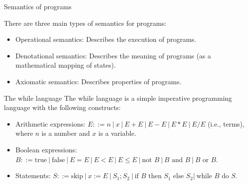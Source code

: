 \documentclass{beamer}
\begin{document}
\begin{frame}{Semantics of programs}

  There are three main types of semantics for programs:
  \begin{itemize}
  \item Operational semantics: Describes the execution of programs.
  \item Denotational semantics: Describes the meaning of programs (as a mathematical mapping of states).
  \item Axiomatic semantics: Describes properties of programs.
  \end{itemize}
  \end{frame}
  \begin{frame}{The while language}
    The while language is a simple imperative programming language with the following constructs:
    \begin{itemize}
      \item Arithmetic expressions: $E::=n\ |\ x\ |\ E+E\ |\ E-E\ |\ E*E\ |\ E/E$ (i.e., terms), where $n$ is a number and $x$ is a variable.
      \item Boolean expressions: $B::=\text{true}\ |\ \text{false}\ |\ E=E\ |\ E<E\ |\ E\leq E\ |\ \text{not } B\ |\ B \text{ and } B\ |\ B\text{ or } B$.
      \item Statements: $S::=\text{skip}\ |\ x:=E\ |\ S_1;S_2\ |\ \text{if }B\text{ then }S_1\text{ else }S_2 |\ \text{while }B\text{ do }S$.
    \end{itemize}
    
    \end{frame}
\end{document}
